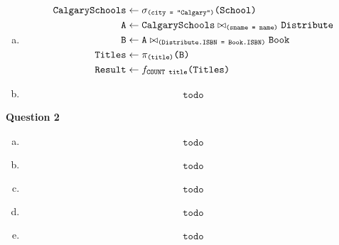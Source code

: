 \documentclass[11pt]{article}
\def\code#1{\texttt{#1}}
\def\select#1#2{\sigma_{\code{(#1)}} \code{(#2)}}
\def\join#1#2#3{\code{#1} \bowtie_{\code{(#2)}} \code{#3}}
\def\proj#1#2{\pi_{\code{(#1)}} \code{(#2)}}
\def\fun#1#2{f_{\code{#1}}{\code{(#2)}}}
\begin{document}
\begin{enumerate}[a.]
    \item
      \begin{equation*}
      \begin{aligned}
        \code{CalgarySchools} &\leftarrow \select{city = "Calgary"}{School} \\
        \code{A} &\leftarrow \join{CalgarySchools}{sname = name}{Distribute} \\
        \code{B} &\leftarrow \join{A}{Distribute.ISBN = Book.ISBN}{Book} \\
        \code{Titles} &\leftarrow \proj{title}{B} \\
        \code{Result} &\leftarrow \fun{\code{COUNT title}}{Titles}
      \end{aligned}
      \end{equation*}

    \item
      \begin{equation*}
      \begin{aligned}
				\code{todo}
      \end{aligned}
      \end{equation*}
  \end{enumerate}


\item[] \textbf{Question 2}

  \begin{enumerate}[a.]

    \item
      \begin{equation*}
      \begin{aligned}
				\code{todo}
      \end{aligned}
      \end{equation*}

    \item 
      \begin{equation*}
      \begin{aligned}
				\code{todo}
      \end{aligned}
      \end{equation*}

    \item
      \begin{equation*}
      \begin{aligned}
				\code{todo}
      \end{aligned}
      \end{equation*}

    \item
      \begin{equation*}
      \begin{aligned}
				\code{todo}
      \end{aligned}
      \end{equation*}

    \item
      \begin{equation*}
      \begin{aligned}
				\code{todo}
      \end{aligned}
      \end{equation*}

  \end{enumerate}
\end{document}
